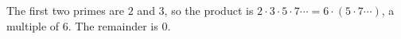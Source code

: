 The first two primes are $2$ and $3$, so the product is $2\cdot3\cdot5\cdot7\cdots=6\cdot(5\cdot7\cdots)$, a multiple of $6$. The remainder is $\boxed{0}$.

